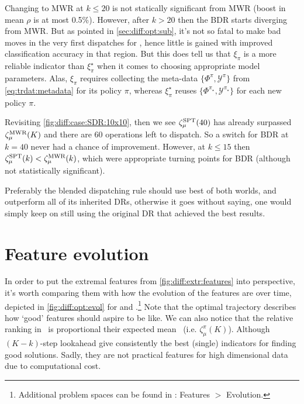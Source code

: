 

\clearpage
Changing to MWR at $k\leq20$ is not statically significant from MWR (boost in 
mean $\rho$ is at most 0.5\%). 
However, after $k>20$ then the BDR starts diverging from MWR. 
But as pointed in \cref{sec:diff:opt:sub}, it's not so fatal to make bad moves 
in the very first dispatches for , hence little is gained with 
improved classification accuracy in that region. 
But this does tell us that $\xi_\pi$ is a more reliable indicator than 
$\xi^\star_\pi$ when it comes to choosing appropriate model parameters. 
Alas, $\xi_\pi$ requires collecting the meta-data 
$\{\Phi^\pi,\mathcal{Y}^\pi\}$ from \cref{eq:trdat:metadata} for its policy 
$\pi$, whereas $\xi^\star_\pi$ reuses 
$\{\Phi^{\pi_\star},\mathcal{Y}^{\pi_\star}\}$ 
for each new policy $\pi$.

Revisiting \cref{fig:diff:case:SDR:10x10}, then we see 
$\zeta_{\mu}^{\text{SPT}}(40)$ has already surpassed 
$\zeta_{\mu}^{\text{MWR}}(K)$ and there are 60 operations left to dispatch. So 
a switch for BDR at $k=40$ never had a chance of improvement. 
However, at $k\leq15$ then $\zeta_{\mu}^{\text{SPT}}(k) < 
\zeta_{\mu}^{\text{MWR}}(k)$, which were appropriate turning points for BDR 
(although not statistically significant).

Preferably the blended dispatching rule should use best of both worlds, and 
outperform all of its inherited DRs, otherwise it goes without saying, one 
would simply keep on still using the original DR that achieved the best results.



\section{Feature evolution}\label{sec:diff:opt:evol}
In order to put the extremal features from \cref{fig:diff:extr:features} into 
perspective, it's worth comparing them with how the evolution of the features 
are over time, depicted in \cref{fig:diff:opt:evol} for  and 
.\footnote{Additional problem spaces can be found in \shiny: 
    Features $>$ Evolution.} 
Note that the optimal trajectory describes  how `good' features should aspire 
to be like.
We can also notice that the relative ranking in \phiGlobalRelated\ is 
proportional their expected mean \namerho\ (i.e. $\zeta_{\mu}^{\pi}(K)$). 
Although $(K-k)$-step lookahead give consistently the best (single) indicators 
for finding good solutions. 
Sadly, they are not practical features for high dimensional data due to 
computational cost. 

